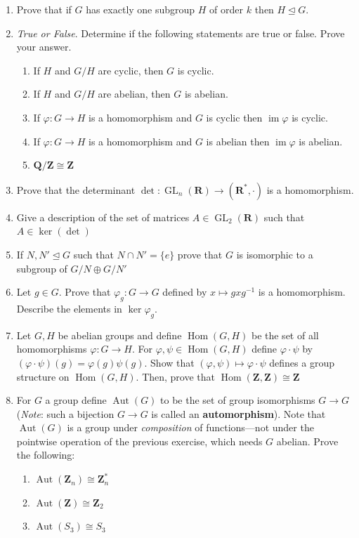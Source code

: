 \documentclass[12pt]{article}
\numberwithin{equation}{subsection}
\theoremstyle{note}
\newcommand{\GL}{\operatorname{GL}}
\newcommand{\nrml}{\trianglelefteq}
\newcommand{\img}{\operatorname{im}}
\newcommand{\Hom}{\operatorname{Hom}}
\newcommand{\Aut}{\operatorname{Aut}}
\begin{document}
\begin{enumerate}[label=\arabic*.]
		\begin{enumerate} 
		\item Prove that $Z(G)$ is a normal subgroup of $G$. 
		\item Prove that if $G/Z(G)$ is cyclic, then $G$ is abelian
		\end{enumerate}
	\item Prove that if $G$ has exactly one subgroup $H$ of order $k$ then $H\nrml G$. 
	\item \textit{True or False}. Determine if the following statements are true or false. Prove your answer. \begin{enumerate}
		\item If $H$ and $G/H$ are cyclic, then $G$ is cyclic.
		\item If $H$ and $G/H$ are abelian, then $G$ is abelian. 
		\item If $\varphi\colon G\to H$ is a homomorphism and $G$ is cyclic then $\img \varphi$ is cyclic.
		\item If $\varphi\colon G\to H$ is a homomorphism and $G$ is abelian then $\img \varphi$ is abelian. 
		\item $\mathbf{Q}/\mathbf{Z}\cong \mathbf{Z}$
	\end{enumerate} 
	\item Prove that the determinant $\det\colon \GL_n(\mathbf{R})\to (\mathbf{R}^*,\cdot)$ is a homomorphism. 
	\item Give a description of the set of matrices $A\in \GL_2(\mathbf{R})$ such that $A\in \ker(\det)$
	\item If $N,N'\nrml G$ such that $N\cap N'=\{e\}$ prove that $G$ is isomorphic to a subgroup of  $G/N \oplus G/N'$
	\item Let $g\in G$. Prove that $\varphi_g\colon G\to G$ defined by $x\mapsto gxg^{-1}$ is a homomorphism. Describe the elements in $\ker\varphi_g$.
	\item Let $G,H$ be abelian groups and define $\Hom(G,H)$ be the set of all homomorphisms $\varphi\colon G\to H$. For $\varphi, \psi\in \Hom(G,H)$ define $\varphi\cdot \psi$ by $(\varphi\cdot \psi)(g)=\varphi(g)\psi(g)$. Show that $(\varphi,\psi)\mapsto \varphi\cdot \psi$ defines a group structure on $\Hom(G,H)$. Then, prove that $\Hom(\mathbf{Z},\mathbf{Z})\cong \mathbf{Z}$
	\item For $G$ a group define $\Aut(G)$ to be the set of group isomorphisms $G\to G$ (\textit{Note}: such a bijection $G\to G$ is called an \textbf{automorphism}). Note that $\Aut(G)$ is a group under \textit{composition} of functions---not under the pointwise operation of the previous exercise, which needs $G$ abelian. Prove the following: 
	\begin{enumerate}
		\item $\Aut(\mathbf{Z}_n)\cong\mathbf{Z}_n^*$
	 	\item $\Aut(\mathbf{Z})\cong \mathbf{Z}_2$
	 	\item $\Aut(S_3)\cong S_3$
	 \end{enumerate}
	 
\end{enumerate}
\end{document}

